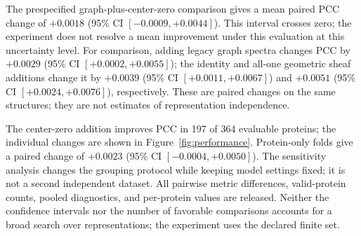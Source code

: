 The prespecified graph-plus-center-zero comparison gives a mean paired PCC change of $+0.0018$ (95\% CI $[-0.0009, +0.0044]$). This interval crosses zero; the experiment does not resolve a mean improvement under this evaluation at this uncertainty level. For comparison, adding legacy graph spectra changes PCC by $+0.0029$ (95\% CI $[+0.0002, +0.0055]$); the identity and all-one geometric sheaf additions change it by $+0.0039$ (95\% CI $[+0.0011, +0.0067]$) and $+0.0051$ (95\% CI $[+0.0024, +0.0076]$), respectively. These are paired changes on the same structures; they are not estimates of representation independence.

The center-zero addition improves PCC in 197 of 364 evaluable proteins; the individual changes are shown in Figure~\ref{fig:performance}. Protein-only folds give a paired change of $+0.0023$ (95\% CI $[-0.0004, +0.0050]$). The sensitivity analysis changes the grouping protocol while keeping model settings fixed; it is not a second independent dataset. All pairwise metric differences, valid-protein counts, pooled diagnostics, and per-protein values are released. Neither the confidence intervals nor the number of favorable comparisons accounts for a broad search over representations; the experiment uses the declared finite set.

